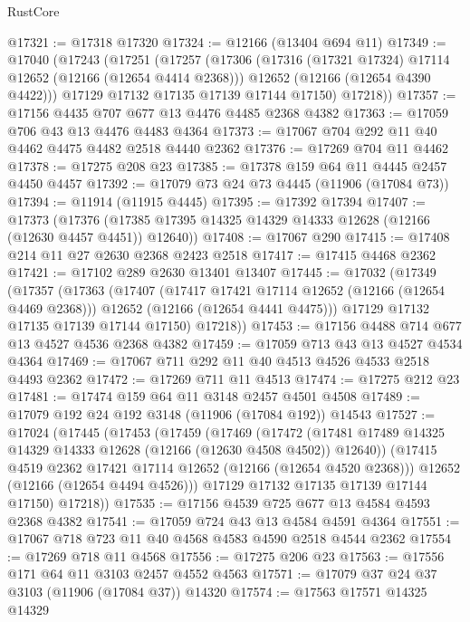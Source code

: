 \begin{lexlean}{RustCore}
\begin{coremodule}
@17321 := @17318 @17320
@17324 := @12166 (@13404 @694 @11)
@17349 := @17040
    (@17243
      (@17251
        (@17257
          (@17306
            (@17316 (@17321 @17324) @17114 @12652 (@12166 (@12654 @4414 @2368)))
            @12652
            (@12166 (@12654 @4390 @4422)))
          @17129
          @17132
          @17135
          @17139
          @17144
          @17150)
        @17218))
@17357 := @17156 @4435 @707 @677 @13 @4476 @4485 @2368 @4382
@17363 := @17059 @706 @43 @13 @4476 @4483 @4364
@17373 := @17067 @704 @292 @11 @40 @4462 @4475 @4482 @2518 @4440 @2362
@17376 := @17269 @704 @11 @4462
@17378 := @17275 @208 @23
@17385 := @17378 @159 @64 @11 @4445 @2457 @4450 @4457
@17392 := @17079 @73 @24 @73 @4445 (@11906 (@17084 @73))
@17394 := @11914 (@11915 @4445)
@17395 := @17392 @17394
@17407 := @17373
    (@17376 (@17385 @17395 @14325 @14329 @14333 @12628 (@12166 (@12630 @4457 @4451)) @12640))
@17408 := @17067 @290
@17415 := @17408 @214 @11 @27 @2630 @2368 @2423 @2518
@17417 := @17415 @4468 @2362
@17421 := @17102 @289 @2630 @13401 @13407
@17445 := @17032
    (@17349
      (@17357
        (@17363
          (@17407
            (@17417 @17421 @17114 @12652 (@12166 (@12654 @4469 @2368)))
            @12652
            (@12166 (@12654 @4441 @4475)))
          @17129
          @17132
          @17135
          @17139
          @17144
          @17150)
        @17218))
@17453 := @17156 @4488 @714 @677 @13 @4527 @4536 @2368 @4382
@17459 := @17059 @713 @43 @13 @4527 @4534 @4364
@17469 := @17067 @711 @292 @11 @40 @4513 @4526 @4533 @2518 @4493 @2362
@17472 := @17269 @711 @11 @4513
@17474 := @17275 @212 @23
@17481 := @17474 @159 @64 @11 @3148 @2457 @4501 @4508
@17489 := @17079 @192 @24 @192 @3148 (@11906 (@17084 @192)) @14543
@17527 := @17024
    (@17445
      (@17453
        (@17459
          (@17469
            (@17472
              (@17481 @17489 @14325 @14329 @14333 @12628 (@12166 (@12630 @4508 @4502)) @12640))
            (@17415 @4519 @2362 @17421 @17114 @12652 (@12166 (@12654 @4520 @2368)))
            @12652
            (@12166 (@12654 @4494 @4526)))
          @17129
          @17132
          @17135
          @17139
          @17144
          @17150)
        @17218))
@17535 := @17156 @4539 @725 @677 @13 @4584 @4593 @2368 @4382
@17541 := @17059 @724 @43 @13 @4584 @4591 @4364
@17551 := @17067 @718 @723 @11 @40 @4568 @4583 @4590 @2518 @4544 @2362
@17554 := @17269 @718 @11 @4568
@17556 := @17275 @206 @23
@17563 := @17556 @171 @64 @11 @3103 @2457 @4552 @4563
@17571 := @17079 @37 @24 @37 @3103 (@11906 (@17084 @37)) @14320
@17574 := @17563 @17571 @14325 @14329

\end{coremodule}
\end{lexlean}
